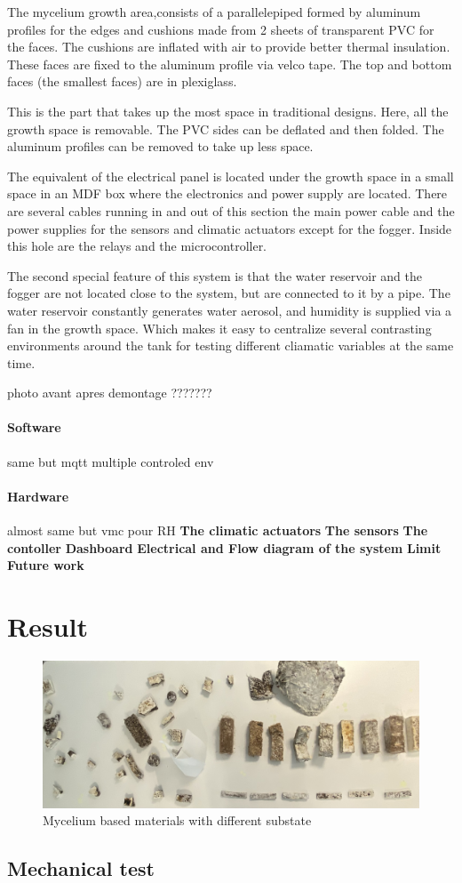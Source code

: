 The mycelium growth area,consists of a parallelepiped formed by aluminum profiles for the edges and cushions made from 2 sheets of transparent PVC for the faces. The cushions are inflated with air to provide better thermal insulation. These faces are fixed to the aluminum profile via velco tape. The top and bottom faces (the smallest faces) are in plexiglass. 

This is the part that takes up the most space in traditional designs. Here, all the growth  space is removable. The PVC sides can be deflated and then folded. The aluminum profiles can be removed to take up less space.

The equivalent of the electrical panel is located under the growth space in a small space in an MDF box where the electronics and power supply are located. There are several cables running in and out of this section the main power cable and the power supplies for the sensors and climatic actuators except for the fogger. Inside this hole are the relays and the microcontroller. 

The second special feature of this system is that the water reservoir and the fogger are not located close to the system, but are connected to it by a pipe. The water reservoir constantly generates water aerosol, and humidity is supplied via a fan in the growth space. 
Which makes it easy to centralize several contrasting environments around the tank for testing different cliamatic variables at the same time. 

photo avant apres demontage ???????

\paragraph{Software}

same but mqtt multiple controled env  
\paragraph{Hardware}

almost same but vmc pour RH 
\textbf{The climatic actuators} 
\textbf{The sensors}
\textbf{The contoller}
\textbf{Dashboard}
\textbf{Electrical and Flow diagram of the system}
\textbf{Limit}
\textbf{Future work}

\section{Result}


\begin{figure}[h]
    \centering
    \includegraphics{images/resultMyce.png}
    \caption{Mycelium based materials with different substate}
    \label{fig:Mycemachinne}
\end{figure} 


\subsection{Mechanical test}


